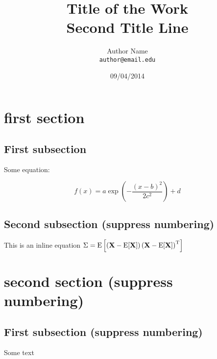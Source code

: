 \documentclass{article}
\title{Title of the Work\\ Second Title Line}
\author{Author Name\\ \texttt{author@email.edu}}
\date{09\slash 04\slash 2014}
\begin{document}

\maketitle %




\section{first section}



\subsection{First subsection}

Some equation:

\begin{equation} f(x) = a \exp{\left(- { \frac{(x-b)^2 }{ 2 c^2} } \right)}+d \end{equation}




\subsection*{Second subsection (suppress numbering)}

This is an inline equation 
$\Sigma=\mathrm{E}
\left[
 \left(
 \textbf{X} - \mathrm{E}[\textbf{X}]
 \right)
 \left(
 \textbf{X} - \mathrm{E}[\textbf{X}]
 \right)^{\rm T}
\right]$

\newpage

\section*{second section (suppress numbering)}

\subsection*{First subsection (suppress numbering)}

Some text
\end{document}
